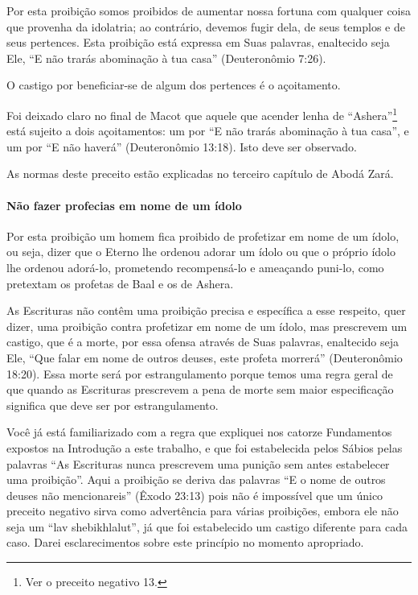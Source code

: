 Por esta proibição somos proibidos de aumentar nossa fortuna com
qualquer coisa que provenha da idolatria; ao contrário, devemos fugir
dela, de seus templos e de seus pertences. Esta proibição está expressa
em Suas palavras, enaltecido seja Ele, ``E não trarás abominação à tua casa''
(Deuteronômio 7:26).

O castigo por beneficiar-se de algum dos pertences é o açoitamento.

Foi deixado claro no final de Macot que aquele que acender lenha de
``Ashera''\footnote{Ver o preceito negativo 13.} está sujeito a dois açoitamentos: um
por ``E não trarás abominação à tua casa'', e um por ``E não haverá''
(Deuteronômio 13:18). Isto deve ser observado.

As normas deste preceito estão explicadas no terceiro capítulo de Abodá
Zará.

\paragraph{Não fazer profecias em nome de um ídolo}

Por esta proibição um homem fica proibido de profetizar em nome de um
ídolo, ou seja, dizer que o Eterno lhe ordenou adorar um ídolo ou que o
próprio ídolo lhe ordenou adorá-lo, prometendo recompensá-lo e
ameaçando puni-lo, como pretextam os profetas de Baal e os de Ashera.

As Escrituras não contêm uma proibição precisa e específica a esse
respeito, quer dizer, uma proibição contra profetizar em nome de um
ídolo, mas prescrevem um castigo, que é a morte, por essa ofensa através
de Suas palavras, enaltecido seja Ele, ``Que falar em nome de outros
deuses, este profeta morrerá'' (Deuteronômio 18:20). Essa morte será por
estrangulamento porque temos uma regra geral de que quando as Escrituras
prescrevem a pena de morte sem maior especificação significa que deve
ser por estrangulamento.

Você já está familiarizado com a regra que expliquei nos catorze
Fundamentos expostos na Introdução a este trabalho, e que foi
estabelecida pelos Sábios pelas palavras ``As Escrituras nunca
prescrevem uma punição sem antes estabelecer uma proibição''. Aqui a
proibição se deriva das palavras ``E o nome de outros deuses não
mencionareis'' (Êxodo 23:13) pois não é impossível que um único
preceito negativo sirva como advertência para várias proibições, embora
ele não seja um ``lav shebikhlalut'', já que foi estabelecido um castigo
diferente para cada caso. Darei esclarecimentos sobre este princípio no
momento apropriado.

